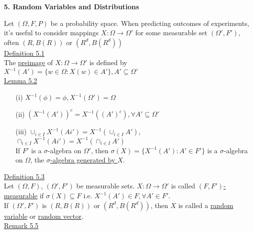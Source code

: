 \documentclass[10pt,letterpaper]{article}
\begin{document}
\pagebreak

\begin{center}
\textbf{5. Random Variables and Distributions}
\end{center}

Let $(\Omega, F, P)$ be a probability space. When predicting outcomes of experiments, it's useful to consider mappings $X:\Omega\rightarrow\Omega'$ for some measurable set $(\Omega', F')$, often $(R, B(R))$ or $(R^d, B(R^d))$\\

\underline{Definition 5.1}\\

The \underline{preimage} of $X:\Omega\rightarrow\Omega'$ is defined by $X^{-1}(A')=\{w\in\Omega: X(w)\in A'\}, A'\subseteq\Omega'$\\

\underline{Lemma 5.2}\\

\begin{enumerate}

\item[(i)] $X^{-1}(\phi)=\phi, X^{-1}(\Omega')=\Omega$
\item[(ii)] $(X^{-1}(A'))^c=X^{-1}((A')^c), \forall A'\subseteq\Omega'$
\item[(iii)] $\cup_{i\in I}X^{-1}(Ai')=X^{-1}(\cup_{i\in I}A')$, $\cap_{i\in I}X^{-1}(Ai')=X^{-1}(\cap_{i\in I}A')$\\

If $F'$ is a $\sigma$-algebra on $\Omega'$, then $\sigma(X)=\{X^{-1}(A'): A'\in F'\}$ is a $\sigma$-algebra on $\Omega$, the \underline{$\sigma$-algebra generated by $X$}.

\end{enumerate}

\underline{Definition 5.3}\\

Let $(\Omega, F)$, $(\Omega', F')$ be measurable sets. $X:\Omega\rightarrow\Omega'$ is called \underline{$(F, F')$-measurable} if $\sigma(X)\subseteq F$ i.e. $X^{-1}(A')\in F, \forall A'\in F'$.\\

If $(\Omega', F')$ is $(R, B(R))$ or $(R^d, B(R^d))$, then $X$ is called a \underline{random variable} or \underline{random vector}.\\

\underline{Remark 5.5}\\
\end{document}
